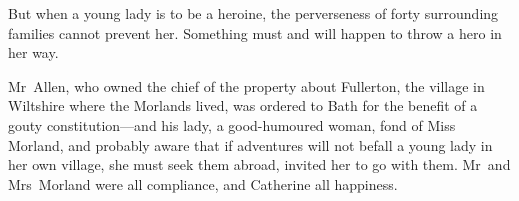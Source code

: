  But when a young lady is to be a heroine, the perverseness of forty surrounding families cannot prevent her. Something must and will happen to throw a hero in her way. 

 Mr~Allen, who owned the chief of the property about Fullerton, the village in Wiltshire where the Morlands lived, was ordered to Bath for the benefit of a gouty constitution—and his lady, a good-humoured woman, fond of Miss Morland, and probably aware that if adventures will not befall a young lady in her own village, she must seek them abroad, invited her to go with them. Mr~and Mrs~Morland were all compliance, and Catherine all happiness. 